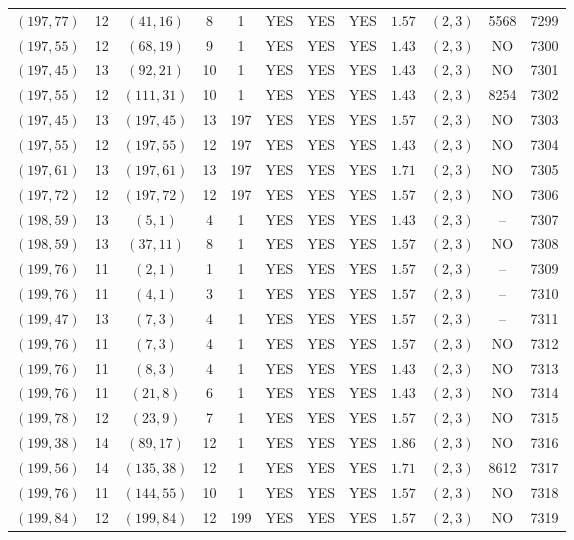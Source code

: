 \begin{longtable}{|c|c|c|c|c|c|c|c|c|c|c|c|}
$(197,77)$ & 12 & $(41,16)$ & 8 & 1 & YES & YES & YES & $1.57$ & $(2,3)$ & 5568 & 7299\\
$(197,55)$ & 12 & $(68,19)$ & 9 & 1 & YES & YES & YES & $1.43$ & $(2,3)$ & NO & 7300\\
$(197,45)$ & 13 & $(92,21)$ & 10 & 1 & YES & YES & YES & $1.43$ & $(2,3)$ & NO & 7301\\
$(197,55)$ & 12 & $(111,31)$ & 10 & 1 & YES & YES & YES & $1.43$ & $(2,3)$ & 8254 & 7302\\
$(197,45)$ & 13 & $(197,45)$ & 13 & 197 & YES & YES & YES & $1.57$ & $(2,3)$ & NO & 7303\\
$(197,55)$ & 12 & $(197,55)$ & 12 & 197 & YES & YES & YES & $1.43$ & $(2,3)$ & NO & 7304\\
$(197,61)$ & 13 & $(197,61)$ & 13 & 197 & YES & YES & YES & $1.71$ & $(2,3)$ & NO & 7305\\
$(197,72)$ & 12 & $(197,72)$ & 12 & 197 & YES & YES & YES & $1.57$ & $(2,3)$ & NO & 7306\\
$(198,59)$ & 13 & $(5,1)$ & 4 & 1 & YES & YES & YES & $1.43$ & $(2,3)$ & -- & 7307\\
$(198,59)$ & 13 & $(37,11)$ & 8 & 1 & YES & YES & YES & $1.57$ & $(2,3)$ & NO & 7308\\
$(199,76)$ & 11 & $(2,1)$ & 1 & 1 & YES & YES & YES & $1.57$ & $(2,3)$ & -- & 7309\\
$(199,76)$ & 11 & $(4,1)$ & 3 & 1 & YES & YES & YES & $1.57$ & $(2,3)$ & -- & 7310\\
$(199,47)$ & 13 & $(7,3)$ & 4 & 1 & YES & YES & YES & $1.57$ & $(2,3)$ & -- & 7311\\
$(199,76)$ & 11 & $(7,3)$ & 4 & 1 & YES & YES & YES & $1.57$ & $(2,3)$ & NO & 7312\\
$(199,76)$ & 11 & $(8,3)$ & 4 & 1 & YES & YES & YES & $1.43$ & $(2,3)$ & NO & 7313\\
$(199,76)$ & 11 & $(21,8)$ & 6 & 1 & YES & YES & YES & $1.43$ & $(2,3)$ & NO & 7314\\
$(199,78)$ & 12 & $(23,9)$ & 7 & 1 & YES & YES & YES & $1.57$ & $(2,3)$ & NO & 7315\\
$(199,38)$ & 14 & $(89,17)$ & 12 & 1 & YES & YES & YES & $1.86$ & $(2,3)$ & NO & 7316\\
$(199,56)$ & 14 & $(135,38)$ & 12 & 1 & YES & YES & YES & $1.71$ & $(2,3)$ & 8612 & 7317\\
$(199,76)$ & 11 & $(144,55)$ & 10 & 1 & YES & YES & YES & $1.57$ & $(2,3)$ & NO & 7318\\
$(199,84)$ & 12 & $(199,84)$ & 12 & 199 & YES & YES & YES & $1.57$ & $(2,3)$ & NO & 7319\\

\end{longtable}
